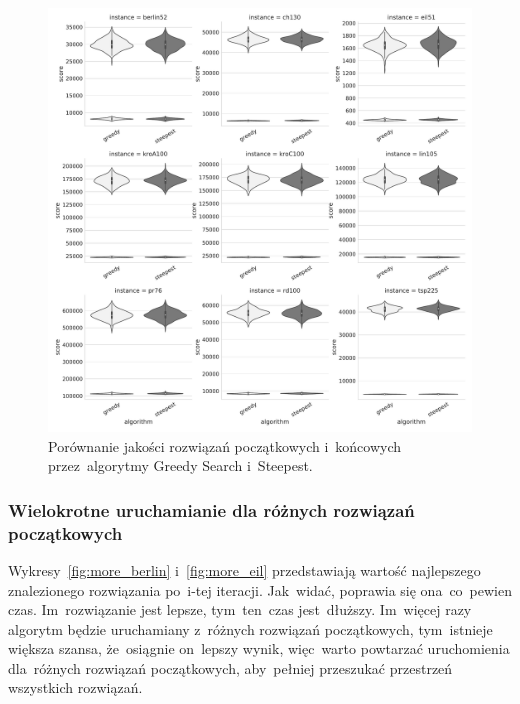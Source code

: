 \begin{figure}[H]
\begin{center}
\includegraphics[width=1.0\textwidth]{graphs/init_vs_final_score_violin.pdf}
\end{center}
\caption{Porównanie jakości rozwiązań początkowych i~końcowych przez~algorytmy Greedy Search i~Steepest.}
\label{fig:diff}
\end{figure}

\subsubsection{Wielokrotne uruchamianie dla różnych rozwiązań początkowych}

Wykresy~\ref{fig:more_berlin} i~\ref{fig:more_eil} przedstawiają wartość najlepszego znalezionego rozwiązania po~i-tej iteracji. Jak~widać, poprawia się ona~co~pewien czas. Im~rozwiązanie jest lepsze, tym~ten~czas jest~dłuższy. Im~więcej razy algorytm będzie uruchamiany z~różnych rozwiązań początkowych, tym~istnieje większa szansa, że~osiągnie on~lepszy wynik, więc~warto powtarzać uruchomienia dla~różnych rozwiązań początkowych, aby~pełniej przeszukać przestrzeń wszystkich rozwiązań.

